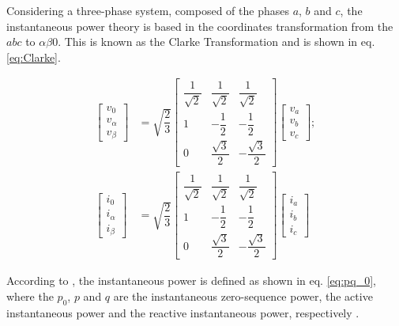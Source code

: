 Considering a three-phase system, composed of the phases $a$, $b$ and $c$, the instantaneous power theory is based in the coordinates transformation from the $abc$ to $\alpha \beta 0 $. This is known as the Clarke Transformation and is shown in eq. \ref{eq:Clarke}.


\begin{equation}
\begin{aligned}
\begin{bmatrix}
v_0\\
v_\alpha\\
v_\beta
\end{bmatrix}
& = \sqrt{\dfrac{2}{3}}
\begin{bmatrix}
\dfrac{1}{\sqrt{2}}	& \dfrac{1}{\sqrt{2}}	& \dfrac{1}{\sqrt{2}}		\\[2ex]
1					& -\dfrac{1}{2}			& -\dfrac{1}{2}				\\[2ex]
0					& \dfrac{\sqrt{3}}{2}	& -\dfrac{\sqrt{3}}{2}
\end{bmatrix}
\begin{bmatrix}
v_a\\
v_b\\
v_c
\end{bmatrix}
;\\
\begin{bmatrix}
i_0\\
i_\alpha\\
i_\beta
\end{bmatrix}
& = \sqrt{\dfrac{2}{3}}
\begin{bmatrix}
\dfrac{1}{\sqrt{2}}	& \dfrac{1}{\sqrt{2}}	& \dfrac{1}{\sqrt{2}}		\\[2ex]
1					& -\dfrac{1}{2}			& -\dfrac{1}{2}				\\[2ex]
0					& \dfrac{\sqrt{3}}{2}	& -\dfrac{\sqrt{3}}{2}
\end{bmatrix}
\begin{bmatrix}
i_a\\
i_b\\
i_c
\end{bmatrix}
\label{eq:Clarke}
\end{aligned}
\end{equation} 

According to \citep{Akagi2007}, the instantaneous power is defined as shown in eq. \ref{eq:pq_0}, where the $p_0$, $p$ and $q$ are the instantaneous zero-sequence power, the active instantaneous power and the reactive instantaneous power, respectively \citep{Akagi2006,Peng1996}.

